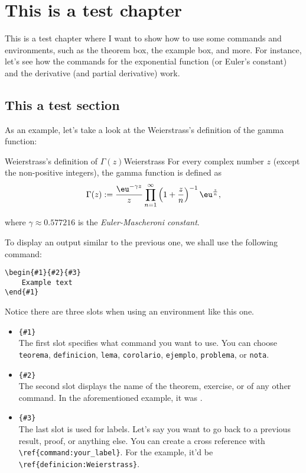 \chapter{This is a test chapter}
This is a test chapter where I want to show how to use some commands and environments, such as the theorem box, the example box, and more. For instance, let's see how the commands for the exponential function (or Euler's constant) and the derivative (and partial derivative) work. 

\section{This a test section}
As an example, let's take a look at the Weierstrass's definition of the gamma function:

\begin{definicion}{Weierstrass's definition of $\Gamma(z)$}{Weierstrass}
For every complex number $z$ (except the non-positive integers), the gamma function is defined as
\[
\Gamma(z) := \dfrac{\eu^{-\gamma z}}{z} \prod_{n = 1}^{\infty}\left(1 + \dfrac{z}{n}\right)^{-1} \eu^{\frac{z}{n}},
\]

where $\gamma \approx 0.577216$ is the \textit{Euler-Mascheroni constant}.
\end{definicion}

To display an output similar to the previous one, we shall use the following command:

\begin{verbatim}
\begin{#1}{#2}{#3}
    Example text
\end{#1}
\end{verbatim}

Notice there are three slots when using an environment like this one.
\begin{itemize}
    \item \verb|{#1}|\\ 
    The first slot specifies what command you want to use. You can choose \texttt{teorema}, \texttt{definicion}, \texttt{lema}, \texttt{corolario}, \texttt{ejemplo}, \texttt{problema}, or \texttt{nota}.

    \item \verb|{#2}|\\
    The second slot displays the name of the theorem, exercise, or of any other command. In the aforementioned example, it was .

    \item \verb|{#3}|\\
    The last slot is used for labels. Let's say you want to go back to a previous result, proof, or anything else. You can create a cross reference with \verb|\ref{command:your_label}|. For the example, it'd be \verb|\ref{definicion:Weierstrass}|.
\end{itemize}

